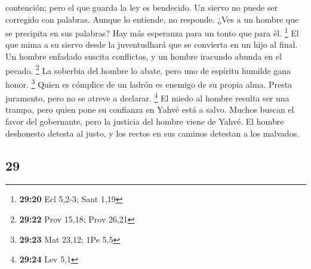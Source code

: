 \begin{paracol}{2}
contención; pero el que guarda la ley es bendecido.  Un
siervo no puede ser corregido con palabras. Aunque lo entiende, no
responde.  ¿Ves a un hombre que se precipita en sus
palabras? Hay más esperanza para un tonto que para él. \footnote{\textbf{29:20}
  Ecl 5,2-3; Sant 1,19}  El que mima a su siervo desde la
juventudhará que se convierta en un hijo al final.  Un
hombre enfadado suscita conflictos, y un hombre iracundo abunda en el
pecado. \footnote{\textbf{29:22} Prov 15,18; Prov 26,21} 
La soberbia del hombre lo abate, pero uno de espíritu humilde gana
honor. \footnote{\textbf{29:23} Mat 23,12; 1Pe 5,5} 
Quien es cómplice de un ladrón es enemigo de su propia alma. Presta
juramento, pero no se atreve a declarar. \footnote{\textbf{29:24} Lev
  5,1}  El miedo al hombre resulta ser una trampa, pero
quien pone su confianza en Yahvé está a salvo.  Muchos
buscan el favor del gobernante, pero la justicia del hombre viene de
Yahvé.  El hombre deshonesto detesta al justo, y los
rectos en sus caminos detestan a los malvados.

\switchcolumn
\begin{otherlanguage}{english}

\hypertarget{section-57}{%
\section{29}\label{section-57}}


\end{otherlanguage}
\end{paracol}
